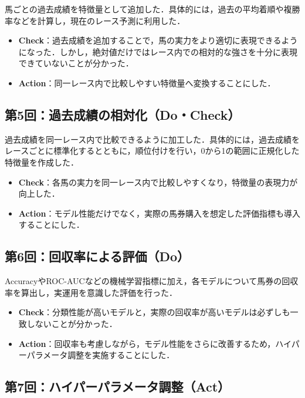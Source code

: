 \documentclass[dvipdfmx, a4paper, 11pt, titlepage]{jsarticle}
\begin{document}
馬ごとの過去成績を特徴量として追加した．具体的には，過去の平均着順や複勝率などを計算し，現在のレース予測に利用した．

\begin{itemize}
    \item \textbf{Check}：過去成績を追加することで，馬の実力をより適切に表現できるようになった．しかし，絶対値だけではレース内での相対的な強さを十分に表現できていないことが分かった．
    \item \textbf{Action}：同一レース内で比較しやすい特徴量へ変換することにした．
\end{itemize}

\subsection{第5回：過去成績の相対化（Do・Check）}

過去成績を同一レース内で比較できるように加工した．具体的には，過去成績をレースごとに標準化するとともに，順位付けを行い，0から1の範囲に正規化した特徴量を作成した．

\begin{itemize}
    \item \textbf{Check}：各馬の実力を同一レース内で比較しやすくなり，特徴量の表現力が向上した．
    \item \textbf{Action}：モデル性能だけでなく，実際の馬券購入を想定した評価指標も導入することにした．
\end{itemize}

\subsection{第6回：回収率による評価（Do）}

AccuracyやROC-AUCなどの機械学習指標に加え，各モデルについて馬券の回収率を算出し，実運用を意識した評価を行った．

\begin{itemize}
    \item \textbf{Check}：分類性能が高いモデルと，実際の回収率が高いモデルは必ずしも一致しないことが分かった．
    \item \textbf{Action}：回収率も考慮しながら，モデル性能をさらに改善するため，ハイパーパラメータ調整を実施することにした．
\end{itemize}

\subsection{第7回：ハイパーパラメータ調整（Act）}
\end{document}
